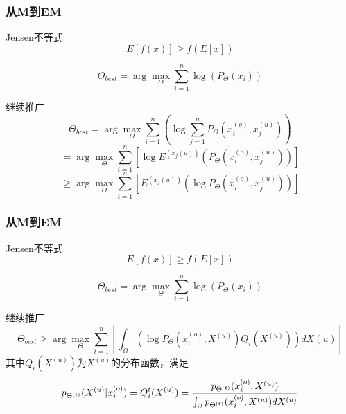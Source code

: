 \documentclass[notheorems, UTF8]{beamer}
\theoremstyle{plain}
\begin{document}
\begin{frame}
\frametitle{从M到EM}
Jensen不等式\\
\begin{displaymath}
E[f(x)] \geq f(E[x])
\end{displaymath}


\begin{displaymath}
\Theta_{best} = \arg \max_{\Theta} \sum_{i = 1}^{n} \log\left(  P_{\Theta}(x_i)\right)
\end{displaymath}

继续推广
\begin{displaymath}
\Theta_{best} = \arg \max_{\Theta} \sum_{i = 1}^{n} \left( \log \sum_{j = 1}^{n} P_{\Theta}(x_i^{(o)}, x_j^{(u)}) \right)\end{displaymath}
\begin{displaymath} 
= \arg \max_{\Theta} \sum_{i = 1}^{n} \left[ \log E^{(x_j{(u)})}\left( P_{\Theta}(x_i^{(o)}, x_j^{(u)}) \right)\right]
\end{displaymath}
\begin{displaymath}
\geq \arg \max_{\Theta} \sum_{i = 1}^{n} \left[ E^{(x_j{(u)})}\left( \log P_{\Theta}(x_i^{(o)}, x_j^{(u)}) \right)\right] 
\end{displaymath}
\end{frame}



\begin{frame}
\frametitle{从M到EM}
Jensen不等式\\
\begin{displaymath}
E[f(x)] \geq f(E[x])
\end{displaymath}


\begin{displaymath}
\Theta_{best} = \arg \max_{\Theta} \sum_{i = 1}^{n} \log\left(  P_{\Theta}(x_i)\right)
\end{displaymath}

继续推广
\begin{displaymath}
\Theta_{best} \geq \arg \max_{\Theta} \sum_{i = 1}^{n} \left[ \int_{\Omega}\left( \log P_{\Theta}(x_i^{(o)}, X^{(u)}) Q_i(X^{(u)}) \right) d X{(u)} \right] 
\end{displaymath}
其中$Q_i(X^{(u)})$为$X^{(u)}$的分布函数，满足
\begin{displaymath}
p_{\Theta^{(t)}}(X^{(u)} | x_i^{(o)}) = Q_i^t(X^{(u)}) = {p_{\Theta^{(t)}}(x_i^{(o)}, X^{(u)}) \over \int_{\Omega}p_{\Theta^{(t)}}(x_i^{(o)}, X^{(u)}) d X^{(u)}}
\end{displaymath} 
\end{frame}
\end{document}
